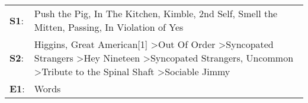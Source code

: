 \begin{supertabular}{p{0.03\textwidth}p{0.92\textwidth}}
 \textbf{S1}:  &                                                                                                                                                                                           Push the Pig\textsuperscript{}, \enspace In The Kitchen\textsuperscript{}, \enspace Kimble\textsuperscript{}, \enspace 2nd Self\textsuperscript{}, \enspace Smell the Mitten\textsuperscript{}, \enspace Passing\textsuperscript{}, \enspace In Violation of Yes\textsuperscript{}  \enspace  \\
 \textbf{S2}:  &  Higgins\textsuperscript{}, \enspace Great American[1]\textsuperscript{} \textgreater \enspace Out Of Order\textsuperscript{} \textgreater \enspace Syncopated Strangers\textsuperscript{} \textgreater \enspace Hey Nineteen\textsuperscript{} \textgreater \enspace Syncopated Strangers\textsuperscript{}, \enspace Uncommon\textsuperscript{} \textgreater \enspace Tribute to the Spinal Shaft\textsuperscript{} \textgreater \enspace Sociable Jimmy\textsuperscript{}  \enspace  \\
 \textbf{E1}:  &                                                                                                                                                                                                                                                                                                                                                                                                                                                      Words\textsuperscript{}  \enspace  \\
\end{supertabular}
